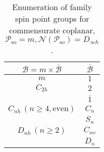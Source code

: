 \begin{table}[tb]
  \centering
  \caption{
    Enumeration of family spin point groups for commensurate coplanar, $\mathcal{P}_{\mathrm{so}} = m, \mathcal{N}(\mathcal{P}_{\mathrm{so}}) = D_{\infty h}$.
  }
  \label{tab:spin_point_group_coplanar}
  \begin{tabular}{cc}
    \hline \hline
    $\mathcal{B} = m \times \bar{\mathcal{B}}$
        & $\bar{\mathcal{B}}$
        \\
    \hline
    $m$                                 & $1$            \\
    $C_{2h}$                            & $2$            \\
                                        & $\overline{1}$ \\
    $C_{nh} \, (n \geq 4, \mbox{even})$ & $C_{n}$        \\
                                        & $S_{n}$        \\
    $D_{nh} \, (n \geq 2)$              & $C_{nv}$       \\
                                        & $D_{n}$        \\
    \hline \hline
  \end{tabular}
\end{table}

